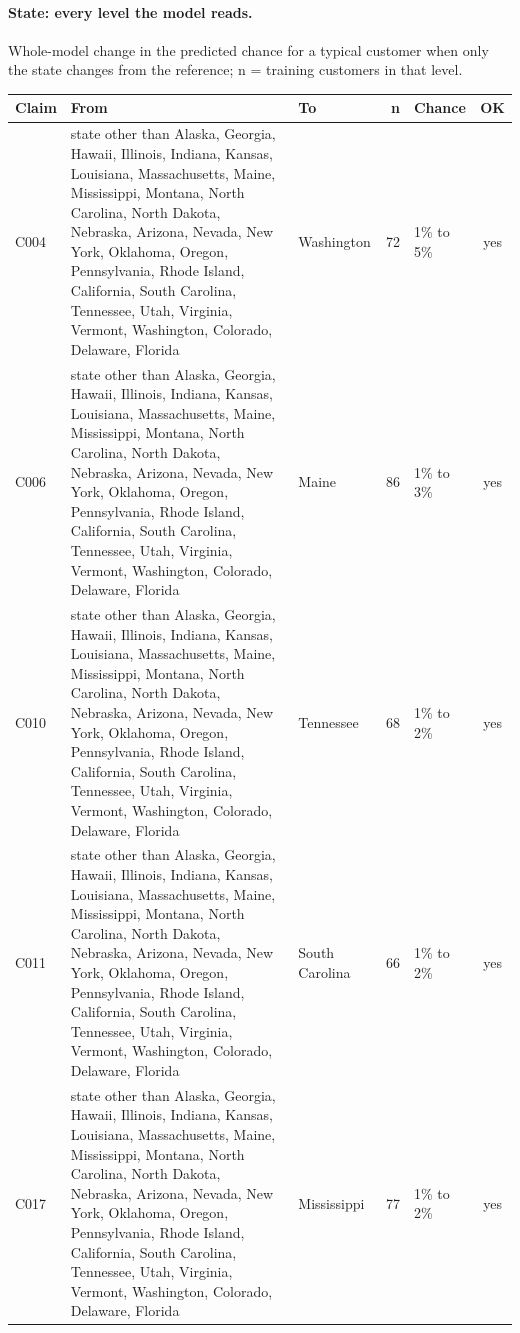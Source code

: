 \documentclass[a4paper,10pt]{article}
\newif\ifreviewmarks
\newcommand{\reviewrule}{\noindent{\color{BrickRed}\rule{\linewidth}{0.8pt}}}
\newenvironment{drafted}[1][]{%
  \ifreviewmarks\par\addvspace{\medskipamount}\reviewrule\par\nopagebreak
  \noindent{\color{BrickRed}\sffamily\footnotesize\textbf{Thesis Draft}\quad #1\hfill review}\par\nopagebreak\smallskip\fi}{%
  \ifreviewmarks\par\smallskip\noindent{\color{BrickRed}\sffamily\footnotesize end of thesis draft}\par\nopagebreak\reviewrule\par\medskip\fi}
\begin{document}
\begin{drafted}[plain-language layer: churn100-s4-c3]
\paragraph{State: every level the model reads.} Whole-model change in the predicted chance for a typical customer when only the state changes from the reference; n = training customers in that level.\par\smallskip
{\scriptsize{}
\begin{longtable}{@{}lllrlc@{}}
\toprule\rowcolor{white}
Claim & From & To & n & Chance & OK \\
\midrule\endhead
\bottomrule\endfoot
C004 & state other than Alaska, Georgia, Hawaii, Illinois, Indiana, Kansas, Louisiana, Massachusetts, Maine, Mississippi, Montana, North Carolina, North Dakota, Nebraska, Arizona, Nevada, New York, Oklahoma, Oregon, Pennsylvania, Rhode Island, California, South Carolina, Tennessee, Utah, Virginia, Vermont, Washington, Colorado, Delaware, Florida & Washington & 72 & 1\% to 5\% & \textcolor{OliveGreen}{yes} \\
C006 & state other than Alaska, Georgia, Hawaii, Illinois, Indiana, Kansas, Louisiana, Massachusetts, Maine, Mississippi, Montana, North Carolina, North Dakota, Nebraska, Arizona, Nevada, New York, Oklahoma, Oregon, Pennsylvania, Rhode Island, California, South Carolina, Tennessee, Utah, Virginia, Vermont, Washington, Colorado, Delaware, Florida & Maine & 86 & 1\% to 3\% & \textcolor{OliveGreen}{yes} \\
C010 & state other than Alaska, Georgia, Hawaii, Illinois, Indiana, Kansas, Louisiana, Massachusetts, Maine, Mississippi, Montana, North Carolina, North Dakota, Nebraska, Arizona, Nevada, New York, Oklahoma, Oregon, Pennsylvania, Rhode Island, California, South Carolina, Tennessee, Utah, Virginia, Vermont, Washington, Colorado, Delaware, Florida & Tennessee & 68 & 1\% to 2\% & \textcolor{OliveGreen}{yes} \\
C011 & state other than Alaska, Georgia, Hawaii, Illinois, Indiana, Kansas, Louisiana, Massachusetts, Maine, Mississippi, Montana, North Carolina, North Dakota, Nebraska, Arizona, Nevada, New York, Oklahoma, Oregon, Pennsylvania, Rhode Island, California, South Carolina, Tennessee, Utah, Virginia, Vermont, Washington, Colorado, Delaware, Florida & South Carolina & 66 & 1\% to 2\% & \textcolor{OliveGreen}{yes} \\
C017 & state other than Alaska, Georgia, Hawaii, Illinois, Indiana, Kansas, Louisiana, Massachusetts, Maine, Mississippi, Montana, North Carolina, North Dakota, Nebraska, Arizona, Nevada, New York, Oklahoma, Oregon, Pennsylvania, Rhode Island, California, South Carolina, Tennessee, Utah, Virginia, Vermont, Washington, Colorado, Delaware, Florida & Mississippi & 77 & 1\% to 2\% & \textcolor{OliveGreen}{yes} \\

\end{longtable}}
\end{drafted}
\end{document}
